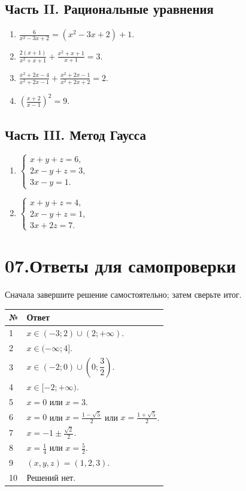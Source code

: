 \documentclass[a4paper,12pt]{article}
\newcommand{\subnote}[1]{{\color{softgray}\small #1}}
\begin{document}
\subsection*{\color{darkaccent}Часть II. Рациональные уравнения}
\begin{enumerate}[label=\textbf{\arabic*.},start=5,itemsep=1em]
\item $\displaystyle \frac6{x^2-3x+2}=(x^2-3x+2)+1.$
\item $\displaystyle \frac{2(x+1)}{x^2+x+1}+\frac{x^2+x+1}{x+1}=3.$
\item $\displaystyle \frac{x^2+2x-4}{x^2+2x-1}
+\frac{x^2+2x-1}{x^2+2x+2}=2.$
\item $\displaystyle \left(\frac{x+2}{x-1}\right)^2=9.$
\end{enumerate}

\subsection*{\color{darkaccent}Часть III. Метод Гаусса}
\begin{enumerate}[label=\textbf{\arabic*.},start=9,itemsep=1em]
\item $\displaystyle \begin{cases}
x+y+z=6,\\ 2x-y+z=3,\\ 3x-y=1.
\end{cases}$
\item $\displaystyle \begin{cases}
x+y+z=4,\\ 2x-y+z=1,\\ 3x+2z=7.
\end{cases}$
\end{enumerate}

\clearpage
\section*{\color{darkaccent}07.\quad Ответы для самопроверки}
\subnote{Сначала завершите решение самостоятельно; затем сверьте итог.}\par\vspace{5mm}
\renewcommand{\arraystretch}{1.6}
\begin{tabularx}{\linewidth}{@{}p{14mm}X@{}}
\toprule
№ & Ответ\\
\midrule
1 & $x\in(-3;2)\cup(2;+\infty)$.\\
2 & $x\in(-\infty;4]$.\\
3 & $x\in(-2;0)\cup\left(0;\dfrac32\right)$.\\
4 & $x\in[-2;+\infty)$.\\
5 & $x=0$ или $x=3$.\\
6 & $x=0$ или $\displaystyle x=\frac{1-\sqrt5}{2}$ или
$\displaystyle x=\frac{1+\sqrt5}{2}$.\\
7 & $\displaystyle x=-1\pm\frac{\sqrt2}{2}$.\\
8 & $\displaystyle x=\frac14$ или $x=\frac52$.\\
9 & $(x,y,z)=(1,2,3)$.\\
10 & Решений нет.\\
\bottomrule
\end{tabularx}
\end{document}
